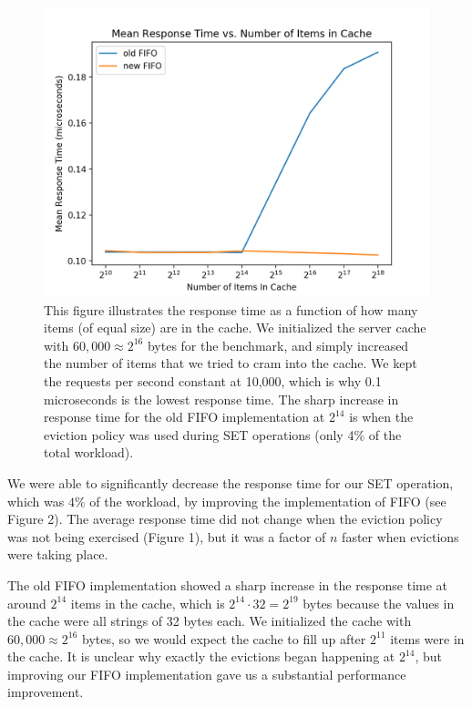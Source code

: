 \documentclass[12pt]{article}
\begin{document}
\begin{figure}
\centering
\includegraphics[scale=0.75]{resp_time_items_cache_newold.png}
\caption{This figure illustrates the response time as a function of how many items (of equal size) are in the cache. We initialized the server cache with $60,000 \approx 2^{16}$ bytes for the  benchmark, and simply increased the number of items that we tried to cram into the cache. We kept the requests per second constant at 10,000, which is why 0.1 microseconds is the lowest response time. The sharp increase in response time for the old FIFO implementation at $2^{14}$ is when the eviction policy was used during SET operations (only 4\% of the total workload).}
\end{figure}

We were able to significantly decrease the response time for our SET operation, which was $4\%$ of the workload, by improving the implementation of FIFO (see Figure 2). The average response time did not change when the eviction policy was not being exercised (Figure 1), but it was a factor of $n$ faster when evictions were taking place. 

The old FIFO implementation showed a sharp increase in the response time at around $2^{14}$ items in the cache, which is $2^{14} \cdot 32 = 2^{19}$ bytes because the values in the cache were all strings of 32 bytes each. We initialized the cache with $60,000 \approx 2^16$ bytes, so we would expect the cache to fill up after $2^{11}$ items were in the cache. It is unclear why exactly the evictions began happening at $2^{14}$, but improving our FIFO implementation gave us a substantial performance improvement. 
\end{document}
